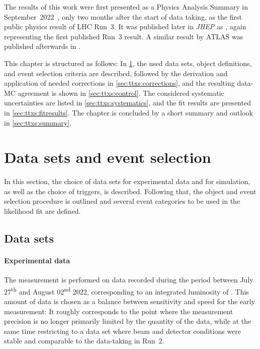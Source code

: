 The results of this work were first presented as a Physics Analysis Summary in September~2022~\cite{CMS:TOP-22-012-PAS}, only two months after the start of data taking, as the first public physics result of LHC Run~3. It was published later in \textit{JHEP} as , again representing the first published Run~3 result. A similar result by ATLAS was published afterwards in .

This chapter is structured as follows: In \cref{sec:ttxs:setup}, the used data sets, object definitions, and event selection criteria are described, followed by the derivation and application of needed corrections in \cref{sec:ttxs:corrections}, and the resulting data-MC agreement is shown in \cref{sec:ttxs:control}. The considered systematic uncertainties are listed in \cref{sec:ttxs:systematics}, and the fit results are presented in \cref{sec:ttxs:fitresults}. The chapter is concluded by a short summary and outlook in \cref{sec:ttxs:summary}.

\section{Data sets and event selection}
\label{sec:ttxs:setup}

In this section, the choice of data sets for experimental data and for simulation, as well as the choice of triggers, is described. Following that, the object and event selection procedure is outlined and several event categories to be used in the likelihood fit are defined. 

\subsection{Data sets}
\label{sec:ttxs:datasets}

\paragraph{Experimental data}
The measurement is performed on data recorded during the period between July 27\textsuperscript{th} and August 02\textsuperscript{nd} 2022, corresponding to an integrated luminosity of \lumiRIII. This amount of data is chosen as a balance between sensitivity and speed for the early measurement: It roughly corresponds to the point where the measurement precision is no longer primarily limited by the quantity of the data, while at the same time restricting to a data set where beam and detector conditions were stable and comparable to the data-taking in Run~2.

